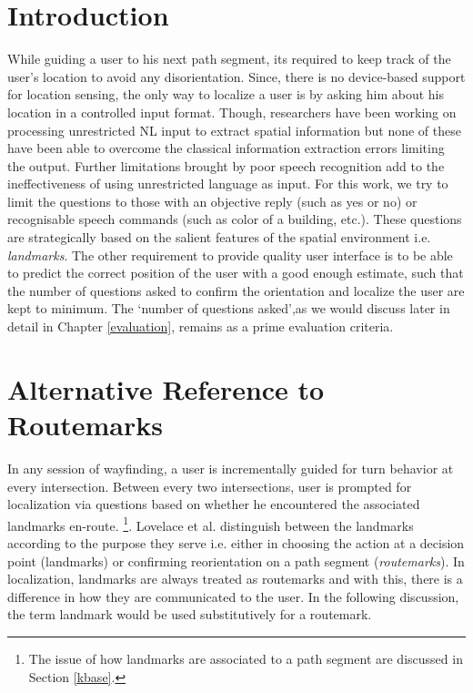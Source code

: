 \documentclass{iitkthesis}
\begin{document}
\section{Introduction} 
While guiding a user to his next path segment, its required to keep track of the user's location to avoid any disorientation. Since, there is no device-based support for location sensing, the only way to localize a user is by asking him about his location in a controlled input format. Though, researchers \cite{tellex:language, Kordjamshidi:labelling, matuszek:following} have been working on processing unrestricted NL input to extract spatial information but none of these have been able to overcome the classical information extraction errors limiting the output. Further limitations brought by poor speech recognition add to the ineffectiveness of using unrestricted language as input. 
For this work, we try to limit the questions to those with an objective reply (such as yes or no) or recognisable speech commands (such as color of a building, etc.). These questions are strategically based on the salient features of the spatial environment i.e. \textit{landmarks}. The other requirement to provide quality user interface is to be able to predict the correct position of the user with a good enough estimate, such that the number of questions asked to confirm the orientation and localize the user are kept to minimum. The `number of questions asked',as we would discuss later in detail in Chapter \ref{evaluation}, remains as a prime evaluation criteria.

\section{Alternative Reference to Routemarks}
In any session of wayfinding, a user is incrementally guided for turn behavior at every intersection. Between every two intersections, user is prompted for localization via questions based on whether he encountered the associated landmarks en-route. \footnote{The issue of how landmarks are associated to a path segment are discussed in Section \ref{kbase}.}. Lovelace et al. \cite{lovelace} distinguish between the landmarks according to the purpose they serve i.e. either in choosing the action at a decision point (landmarks) or confirming reorientation on a path segment (\textit{routemarks}). In localization, landmarks are always treated as routemarks and with this, there is a difference in how they are communicated to the user. In the following discussion, the term landmark would be used substitutively for a routemark. 
\end{document}
